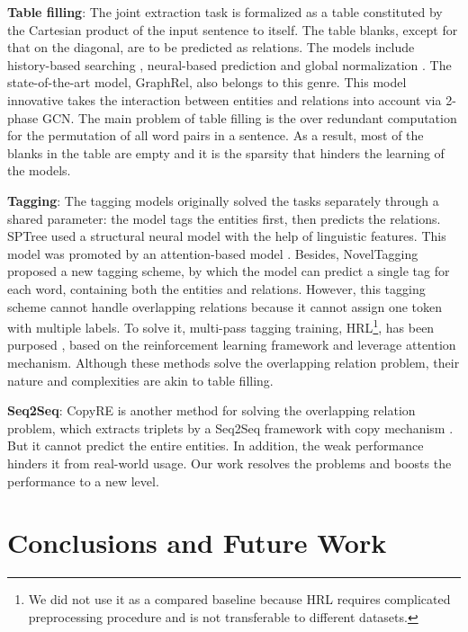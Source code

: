 \documentclass[letterpaper]{article} \usepackage{aaai20}  \usepackage{times}  \usepackage{helvet} \usepackage{courier}  \usepackage[hyphens]{url}  \usepackage{graphicx}
\begin{document}
  
   \textbf{Table filling}: The joint extraction task is formalized as a table constituted by the Cartesian product of the input sentence to itself. 
The table blanks, except for that on the diagonal, are to be predicted as relations.
      The models include history-based searching \cite{14table_fill}, neural-based prediction \cite{table_filling} and global normalization \cite{crf_norm}. The state-of-the-art model, GraphRel, also belongs to this genre. This model innovative takes the interaction between entities and relations into account via 2-phase GCN. The main problem of table filling is the over redundant computation for the permutation of all word pairs in a sentence. As a result, most of the blanks in the table are empty and it is the sparsity that hinders the learning of the models.
  


   \textbf{Tagging}: The tagging models originally solved the tasks separately through a shared parameter: the model tags the entities first, then predicts the relations. 
SPTree \cite{tree} used a structural neural model with the help of linguistic features. 
      This model was promoted by an attention-based model \cite{limb}. 
Besides, NovelTagging \cite{novel_tagging} proposed a new tagging scheme, by which the model can predict a single tag for each word, containing both the entities and relations. However, this tagging scheme cannot handle overlapping relations because it cannot assign one token with multiple labels. 
To solve it, multi-pass tagging training, HRL\footnote{We did not use it as a compared baseline because HRL requires complicated preprocessing procedure and is not transferable to different datasets. 
}, has been purposed \cite{rlre}, based on the reinforcement learning framework and \cite{tag2table} leverage attention mechanism. Although these methods solve the overlapping relation problem, their nature and complexities are akin to table filling.
  
   \textbf{Seq2Seq}: CopyRE \cite{CopyRE} is another method for solving the overlapping relation problem, which extracts triplets by a Seq2Seq framework \cite{Seq2Seq} with copy mechanism \cite{CopyNet}. But it cannot predict the entire entities. In addition, the weak performance hinders it from real-world usage. 
   Our work resolves the problems and boosts the performance to a new level.
  
  \section{Conclusions and Future Work}
  
\end{document}
